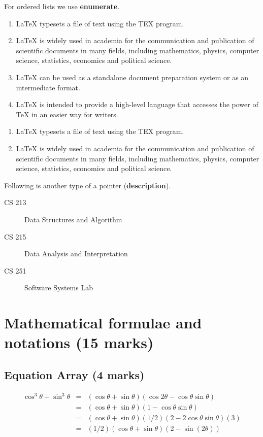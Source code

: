 \documentclass[11pt]{article}
\begin{document}
\noindent For ordered lists we use {\textbf{enumerate}}.

\begin{enumerate}[label=\Roman*]
	\item {\LaTeX{}} typesets a file of text using the TEX program.
	\item {\LaTeX{}} is widely used in academia for the communication and publication of scientific documents in many fields, including mathematics, physics, computer science, statistics, economics and political science.
	\item {\LaTeX{}} can be used as a standalone document preparation system or as an intermediate format.
	\item {\LaTeX{}} is intended to provide a high-level language that accesses the power of TeX in an easier way for writers.
\end{enumerate}

\begin{enumerate}[label=(\alph*)]
	\item {\LaTeX{}} typesets a file of text using the TEX program.
	\item {\LaTeX{}} is widely used in academia for the communication and publication of scientific documents in many fields, including mathematics, physics, computer science, statistics, economics and political science.\\
\end{enumerate}

Following is another type of a pointer ({\textbf{description}}).\\
\begin{description}
    \item[CS 213] Data Structures and Algorithm
    \item[CS 215] Data Analysis and Interpretation
    \item[CS 251] Software Systems Lab
\end{description}
\newpage

\section{Mathematical formulae and notations (15 marks)}

\subsection{Equation Array (4 marks)}
\begin{eqnarray}
	\cos^3 \theta + \sin^3 \theta & = & (\cos \theta + \sin \theta)(\cos 2\theta - \cos \theta \sin \theta) \\
            	 				  & = & (\cos \theta + \sin \theta)(1 - \cos \theta \sin \theta) \\
            	 				  & = & (\cos \theta + \sin \theta)(1/2)(2 - 2\cos \theta \sin \theta)(3) \\
            	 				  & = & (1/2)(\cos \theta + \sin \theta)(2 - \sin (2\theta))
\end{eqnarray}
\end{document}
